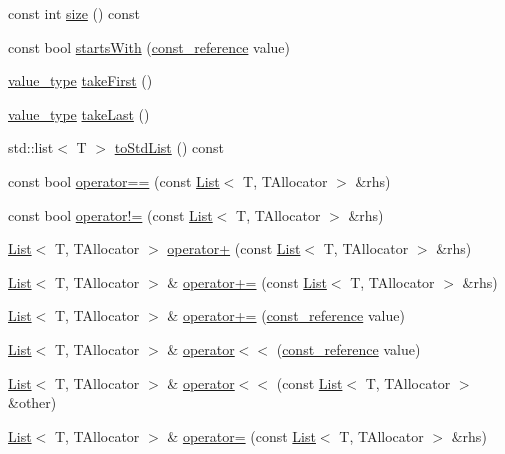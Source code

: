 \begin{DoxyCompactItemize}
const int \hyperlink{classprism_1_1_list_a6655ac493bd63dd8d7dda060b556cbcf}{size} () const 
\item 
const bool \hyperlink{classprism_1_1_list_ac0919b9f4f0312e5124cdc4eeb491114}{starts\+With} (\hyperlink{classprism_1_1_list_aa263682b12cb5ca200c1b30f85fac524}{const\+\_\+reference} value)
\item 
\hyperlink{classprism_1_1_list_a3e9cab77c935e6bc2e96bcb00006382e}{value\+\_\+type} \hyperlink{classprism_1_1_list_ac24aaa71bcfa3cfb80c1b466704a9b21}{take\+First} ()
\item 
\hyperlink{classprism_1_1_list_a3e9cab77c935e6bc2e96bcb00006382e}{value\+\_\+type} \hyperlink{classprism_1_1_list_a520735132b94b8cf7feaf3f0bbba2ca7}{take\+Last} ()
\item 
std\+::list$<$ T $>$ \hyperlink{classprism_1_1_list_a185229de116456a6ccb911e1b4599f8a}{to\+Std\+List} () const 
\item 
const bool \hyperlink{classprism_1_1_list_ae7ff0643ac1abebaed89ff72ff45e233}{operator==} (const \hyperlink{classprism_1_1_list}{List}$<$ T, T\+Allocator $>$ \&rhs)
\item 
const bool \hyperlink{classprism_1_1_list_a41d0ce745cf5ec6514a70a96dec8c2fb}{operator!=} (const \hyperlink{classprism_1_1_list}{List}$<$ T, T\+Allocator $>$ \&rhs)
\item 
\hyperlink{classprism_1_1_list}{List}$<$ T, T\+Allocator $>$ \hyperlink{classprism_1_1_list_aaf0b0a42de4cd250ec07943fb1255173}{operator+} (const \hyperlink{classprism_1_1_list}{List}$<$ T, T\+Allocator $>$ \&rhs)
\item 
\hyperlink{classprism_1_1_list}{List}$<$ T, T\+Allocator $>$ \& \hyperlink{classprism_1_1_list_a7e5e6a5c6f80f1b116810049ada54f95}{operator+=} (const \hyperlink{classprism_1_1_list}{List}$<$ T, T\+Allocator $>$ \&rhs)
\item 
\hyperlink{classprism_1_1_list}{List}$<$ T, T\+Allocator $>$ \& \hyperlink{classprism_1_1_list_ab0c98e10fe7476af0b6b0fc539dd8f16}{operator+=} (\hyperlink{classprism_1_1_list_aa263682b12cb5ca200c1b30f85fac524}{const\+\_\+reference} value)
\item 
\hyperlink{classprism_1_1_list}{List}$<$ T, T\+Allocator $>$ \& \hyperlink{classprism_1_1_list_a4420d770c7a0cb6dc31fb4c8e68fc047}{operator$<$$<$} (\hyperlink{classprism_1_1_list_aa263682b12cb5ca200c1b30f85fac524}{const\+\_\+reference} value)
\item 
\hyperlink{classprism_1_1_list}{List}$<$ T, T\+Allocator $>$ \& \hyperlink{classprism_1_1_list_ae7b01ded233254d4b12fd5e501c30f01}{operator$<$$<$} (const \hyperlink{classprism_1_1_list}{List}$<$ T, T\+Allocator $>$ \&other)
\item 
\hyperlink{classprism_1_1_list}{List}$<$ T, T\+Allocator $>$ \& \hyperlink{classprism_1_1_list_a8cfa274e9550ac47e36577adb7472d74}{operator=} (const \hyperlink{classprism_1_1_list}{List}$<$ T, T\+Allocator $>$ \&rhs)
\end{DoxyCompactItemize}
